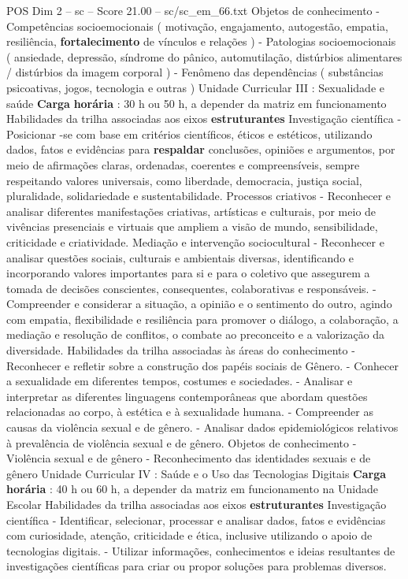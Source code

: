 \begin{textsample}{POS Dim 2 – sc – Score 21.00 – sc/sc\_em\_66.txt}
Objetos de conhecimento - Competências socioemocionais ( motivação, engajamento, autogestão, empatia, resiliência, \textbf{fortalecimento} de vínculos e relações ) - Patologias socioemocionais ( ansiedade, depressão, síndrome do pânico, automutilação, distúrbios alimentares / distúrbios da imagem corporal ) - Fenômeno das dependências ( substâncias psicoativas, jogos, tecnologia e outras ) Unidade Curricular III : Sexualidade e saúde \textbf{Carga} \textbf{horária} : 30 h ou 50 h, a depender da matriz em funcionamento Habilidades da trilha associadas aos eixos \textbf{estruturantes} Investigação científica - Posicionar -se com base em critérios científicos, éticos e estéticos, utilizando dados, fatos e evidências para \textbf{respaldar} conclusões, opiniões e argumentos, por meio de afirmações claras, ordenadas, coerentes e compreensíveis, sempre respeitando valores universais, como liberdade, democracia, justiça social, pluralidade, solidariedade e sustentabilidade.
Processos criativos - Reconhecer e analisar diferentes manifestações criativas, artísticas e culturais, por meio de vivências presenciais e virtuais que ampliem a visão de mundo, sensibilidade, criticidade e criatividade.
Mediação e intervenção sociocultural - Reconhecer e analisar questões sociais, culturais e ambientais diversas, identificando e incorporando valores importantes para si e para o coletivo que assegurem a tomada de decisões conscientes, consequentes, colaborativas e responsáveis. - Compreender e considerar a situação, a opinião e o sentimento do outro, agindo com empatia, flexibilidade e resiliência para promover o diálogo, a colaboração, a mediação e resolução de conflitos, o combate ao preconceito e a valorização da diversidade.
Habilidades da trilha associadas às áreas do conhecimento - Reconhecer e refletir sobre a construção dos papéis sociais de Gênero. - Conhecer a sexualidade em diferentes tempos, costumes e sociedades. - Analisar e interpretar as diferentes linguagens contemporâneas que abordam questões relacionadas ao corpo, à estética e à sexualidade humana. - Compreender as causas da violência sexual e de gênero. - Analisar dados epidemiológicos relativos à prevalência de violência sexual e de gênero.
Objetos de conhecimento - Violência sexual e de gênero - Reconhecimento das identidades sexuais e de gênero Unidade Curricular IV : Saúde e o Uso das Tecnologias Digitais \textbf{Carga} \textbf{horária} : 40 h ou 60 h, a depender da matriz em funcionamento na Unidade Escolar Habilidades da trilha associadas aos eixos \textbf{estruturantes} Investigação científica - Identificar, selecionar, processar e analisar dados, fatos e evidências com curiosidade, atenção, criticidade e ética, inclusive utilizando o apoio de tecnologias digitais. - Utilizar informações, conhecimentos e ideias resultantes de investigações científicas para criar ou propor soluções para problemas diversos.

\end{textsample}
